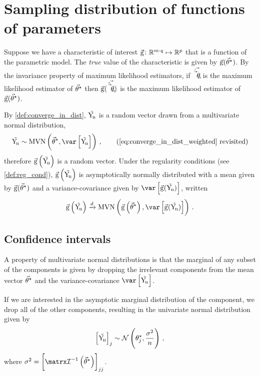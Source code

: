 \documentclass[../main.tex]{subfiles}
\begin{document}
\chapter{Sampling distribution of functions of parameters}
\label{sec:app}
Suppose we have a characteristic of interest $\vec{\operatorname{g}} \colon \mathbb{R}^{m \cdot q} \mapsto \mathbb{R}^{p}$ that is a function of the parametric model.
The \emph{true} value of the characteristic is given by $\vec{\operatorname{g}}({\vec{\theta}}^{\star})$.
By the invariance property of maximum likelihood estimators, if $\vec{\hat{\vec{\theta}}_{n}}$ is the maximum likelihood estimator of ${\vec{\theta}}^{\star}$ then $\vec{\operatorname{g}}(\vec{\hat{\vec{\theta}}_{n}})$ is the maximum likelihood estimator of $\vec{\operatorname{g}}({\vec{\theta}}^{\star})$.

By \cref{def:converge_in_dist}, $\mathrm{\vec{Y_{\!n}}}$ is a random vector drawn from a multivariate normal distribution,
\begin{equation*}
    \sampdu \sim \mvn\left(\tparam\sysparamvec, \var\left[\sampdu\right]\right)\,,
    \tag{\text{\ref{eq:converge_in_dist_weighted} revisited}}
\end{equation*}
therefore $\vec{\operatorname{g}}\left(\mathrm{\vec{Y_{\!n}}}\right)$ is a random vector. Under the regularity conditions (see \cref{def:reg_cond}), $\vec{\operatorname{g}}\left(\mathrm{\vec{Y_{\!n}}}\right)$ is asymptotically normally distributed with a mean given by $\vec{\operatorname{g}}({\vec{\theta}}^{\star})$ and a variance-covariance given by $\var\left[\vecstat(\sampdu)\right]$, written
\begin{equation}
\vecstat\left(\sampdu\right) \xrightarrow{d} \mvn\left(\vecstat\left(\tparam\sysparamvec\right), \var\left[\vecstat(\sampdu)\right]\right)\,.
\end{equation}

\section{Confidence intervals}
\label{sec:app:conf_interval}
A property of multivariate normal distributions is that the marginal of any subset of the components is given by dropping the irrelevant components from the mean vector ${\vec{\theta}}^{\star}$ and the variance-covariance $\var\left[\sampdu\right]$.

If we are interested in the asymptotic marginal distribution of the \jth component, we drop all of the other components, resulting in the univariate normal distribution given by
\begin{equation}
\label{eq:normal_marg}
    \left[\mathrm{\vec{Y_{\!n}}}\right]_j \sim \mathcal{N}\left({\theta}^{\star}_j, \frac{\sigma^2}{n}\right)\,,
\end{equation}
where $\sigma^2 = \left[\infomatrx^{-1}\left(\tparam\sysparamvec\right)\right]_{j j}$.
\end{document}
